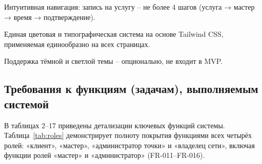 Интуитивная навигация: запись на услугу -- не более 4 шагов (услуга → мастер → время → подтверждение).

Единая цветовая и типографическая система на основе Tailwind CSS, применяемая единообразно на всех страницах.

Поддержка тёмной и светлой темы -- опционально, не входит в MVP.

\subsection{Требования к функциям (задачам), выполняемым системой}
\label{sec:functions}
В таблицах 2--17 приведены детализации ключевых функций системы. Таблица~\ref{tab:roles} демонстрирует полноту покрытия функциями всех четырёх ролей: «клиент», «мастер», «администратор точки» и «владелец сети», включая функции ролей «мастер» и «администратор» (FR-011--FR-016).

